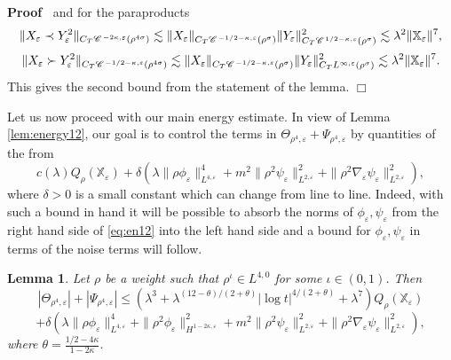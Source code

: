 \documentclass[a4paper,11pt]{article}
\newenvironment{proof}{\noindent\textbf{Proof\ }}{\hspace*{\fill}$\Box$\medskip}
\newtheorem{lemma}[theorem]{Lemma}
\numberwithin{equation}{section}
\newcommand{\CC}{\mathscr{C} \hspace{.1em}}
\begin{document}
\begin{proof}
  and for the paraproducts
  \[ \| X_{\varepsilon} \prec Y_{\varepsilon}^2 \|_{C_T \CC^{- 2 \kappa,
     \varepsilon} (\rho^{4 \sigma})} \lesssim \| X_{\varepsilon} \|_{C_T
     \CC^{- 1 / 2 - \kappa, \varepsilon} (\rho^{\sigma})} \| Y_{\varepsilon}
     \|^2_{C_T \CC^{1 / 2 - \kappa, \varepsilon} (\rho^{\sigma})} \lesssim \lambda^2
     \|\mathbb{X}_{\varepsilon}\|^{7}, \]
  \[ \| X_{\varepsilon} \succ Y_{\varepsilon}^2 \|_{C_T \CC^{- 1 / 2 - \kappa,
     \varepsilon} (\rho^{4 \sigma})} \lesssim \| X_{\varepsilon} \|_{C_T
     \CC^{- 1 / 2 - \kappa, \varepsilon} (\rho^{\sigma})} \| Y_{\varepsilon}
     \|^2_{C_T L^{\infty, \varepsilon} (\rho^{\sigma})} \lesssim \lambda^2 
     \|\mathbb{X}_{\varepsilon}\|^{7} . \]
       This gives the second bound from the statement of the lemma.
\end{proof}

Let us now proceed with our main energy estimate. In view of Lemma
\ref{lem:energy12}, our goal is to control the terms in $\Theta_{\rho^4,
\varepsilon} + \Psi_{\rho^4, \varepsilon}$ by quantities of the from
\[ c(\lambda) Q_{\rho} (\mathbb{X}_{\varepsilon}) + \delta (\lambda \| \rho \phi_{\varepsilon}
   \|_{L^{4, \varepsilon}}^4 + m^{2} \| \rho^2 \psi_{\varepsilon} \|_{L^{2,
   \varepsilon}}^2 + \| \rho^2 \nabla_{\varepsilon} \psi_{\varepsilon}
   \|_{L^{2, \varepsilon}}^2), \]
where $\delta > 0$ is a small constant which can change from line to line.
Indeed, with such a bound in hand it will be possible to absorb the norms of
$\phi_{\varepsilon}, \psi_{\varepsilon}$ from the right hand side of
{\eqref{eq:en12}} into the left hand side and a bound for $\phi_{\varepsilon},
\psi_{\varepsilon}$ in terms of the noise terms will follow.

\begin{lemma}
  \label{lemma:bounds-rhs1}Let $\rho$ be a weight such that $\rho^{\iota} \in
  L^{4, 0}$ for some $\iota \in (0, 1)$. Then
  \[ | \Theta_{\rho^4, \varepsilon} | + | \Psi_{\rho^4, \varepsilon} |
     \leqslant ( \lambda^3+\lambda^{(12 - \theta)
     / (2 + \theta)} | \log t|^{4 / (2 + \theta)}+ \lambda^{7}) Q_{\rho} (\mathbb{X}_{\varepsilon}) \]
  \[ + \delta (\lambda \| \rho \phi_{\varepsilon} \|_{L^{4, \varepsilon}}^4 + \|
     \rho^2 \phi_{\varepsilon} \|_{H^{1 - 2 \kappa, \varepsilon}}^2 + m^{2}\|
     \rho^2 \psi_{\varepsilon} \|^2_{L^{2, \varepsilon}} + \| \rho^2 \nabla_{\varepsilon}
     \psi_{\varepsilon} \|^2_{L^{2, \varepsilon}}), \]
where $\theta=\frac{1/2-4\kappa}{1-2\kappa}$.
\end{lemma}
\end{document}
